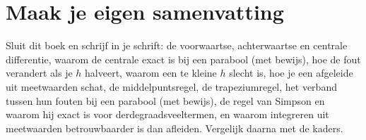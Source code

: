 

\begin{oefeningen}


\end{oefeningen}


\begin{oefeningen}






\end{oefeningen}


\ifzelfstudie
\section*{Maak je eigen samenvatting}
Sluit dit boek en schrijf in je schrift: de voorwaartse, achterwaartse en centrale differentie, waarom de centrale exact is bij een parabool (met bewijs), hoe de fout verandert als je $h$ halveert, waarom een te kleine $h$ slecht is, hoe je een afgeleide uit meetwaarden schat, de middelpuntsregel, de trapeziumregel, het verband tussen hun fouten bij een parabool (met bewijs), de regel van Simpson en waarom hij exact is voor derdegraadsveeltermen, en waarom integreren uit meetwaarden betrouwbaarder is dan afleiden. Vergelijk daarna met de kaders.
\fi
